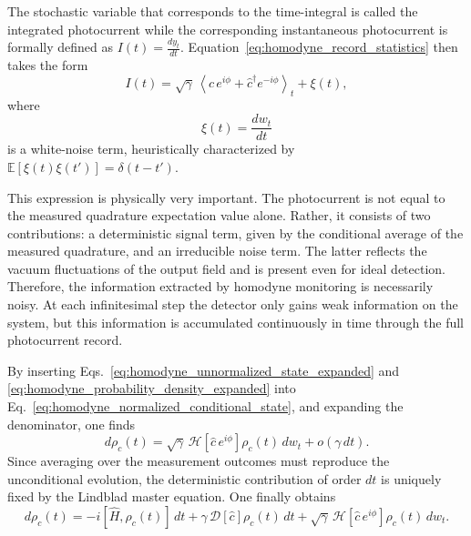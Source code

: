 The stochastic variable that corresponds to the time-integral is called the integrated photocurrent while the corresponding instantaneous photocurrent is formally defined as $I(t)=\frac{dy_t}{dt}.$
Equation~\eqref{eq:homodyne_record_statistics} then takes the form
\begin{equation}
	I(t)
	=
	\sqrt{\gamma}\,
	\left\langle
	\hat c\,e^{i\phi}+\hat c^\dagger e^{-i\phi}
	\right\rangle_t
	+
	\xi(t),
	\label{eq:homodyne_photocurrent_signal_noise}
\end{equation}
where
\begin{equation}
	\xi(t)=\frac{dw_t}{dt}
	\label{eq:homodyne_white_noise_definition}
\end{equation}
is a white-noise term, heuristically characterized by $\mathbb{E}[\xi(t)\xi(t')]=\delta(t-t').$

This expression is physically very important. The photocurrent is not equal to the measured quadrature expectation value alone. Rather, it consists of two contributions: a deterministic signal term, given by the conditional average of the measured quadrature, and an irreducible noise term. The latter reflects the vacuum fluctuations of the output field and is present even for ideal detection. Therefore, the information extracted by homodyne monitoring is necessarily noisy. At each infinitesimal step the detector only gains weak information on the system, but this information is accumulated continuously in time through the full photocurrent record.

By inserting Eqs.~\eqref{eq:homodyne_unnormalized_state_expanded} and \eqref{eq:homodyne_probability_density_expanded} into Eq.~\eqref{eq:homodyne_normalized_conditional_state}, and expanding the denominator, one finds
\begin{equation}
	d\rho_c(t)
	=
	\sqrt{\gamma}\,
	\mathcal{H}\!\left[\hat c\,e^{i\phi}\right]\rho_c(t)\,dw_t
	+
	o(\gamma\,dt).
	\label{eq:homodyne_state_update_stochastic_part}
\end{equation}
Since averaging over the measurement outcomes must reproduce the unconditional evolution, the deterministic contribution of order \(dt\) is uniquely fixed by the Lindblad master equation. One finally obtains
\begin{equation}
	d\rho_c(t)
	=
	-i[\hat H,\rho_c(t)]\,dt
	+
	\gamma\,\mathcal{D}[\hat c]\rho_c(t)\,dt
	+
	\sqrt{\gamma}\,
	\mathcal{H}\!\left[\hat c\,e^{i\phi}\right]\rho_c(t)\,dw_t.
	\label{eq:homodyne_sme_wiener_form}
\end{equation}

